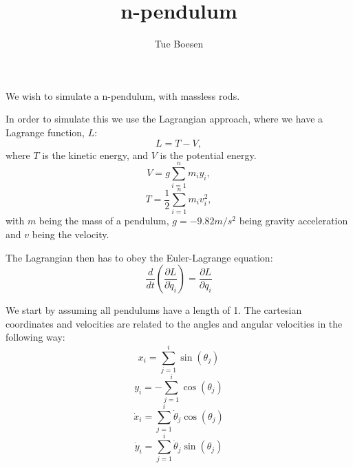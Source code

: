 \documentclass{article}
\begin{document}
\title{n-pendulum}
\author[$\dagger$]{Tue Boesen}

\maketitle

We wish to simulate a n-pendulum, with massless rods.

In order to simulate this we use the Lagrangian approach, where we have a Lagrange function, $L$:
\begin{equation}
L = T - V,
\end{equation}
where $T$ is the kinetic energy, and $V$ is the potential energy.
\begin{equation}
V = g \sum_{i=1}^n m_i y_i, 
\end{equation}
\begin{equation}
T = \frac{1}{2} \sum_{i=1}^n m_i v_i^2,
\end{equation}
with $m$ being the mass of a pendulum, $g=-9.82 m/s^2$ being gravity acceleration and $v$ being the velocity.

The Lagrangian then has to obey the Euler-Lagrange equation:
\begin{equation}
\frac{d}{dt}\left( \frac{\partial L}{\partial \dot{q}_i} \right) = \frac{\partial L}{\partial q_i}
\end{equation}

We start by assuming all pendulums have a length of 1.
The cartesian coordinates and velocities are related to the angles and angular velocities in the following way:
\begin{equation}
x_i = \sum_{j=1}^i \sin(\theta_j)
\end{equation}
\begin{equation}
y_i = - \sum_{j=1}^i \cos (\theta_j)
\end{equation}
\begin{equation}
\dot{x}_i = \sum_{j=1}^i \dot{\theta}_j \cos(\theta_j)
\end{equation}
\begin{equation}
\dot{y}_i = \sum_{j=1}^i \dot{\theta}_j \sin(\theta_j)
\end{equation}
\end{document}
